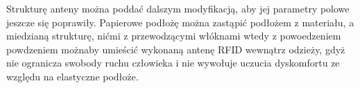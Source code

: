 Strukturę anteny można poddać dalszym modyfikacją, aby jej parametry polowe jeszcze się poprawiły. Papierowe podłożę można zastąpić podłożem z materiału, a miedzianą strukturę, nićmi z przewodzącymi włóknami wtedy z powoedzeniem powdzeniem możnaby umieścić wykonaną antenę RFID wewnątrz odzieży, gdyż nie ogranicza swobody ruchu człowieka i nie wywołuje uczucia dyskomfortu ze względu na elastyczne podłoże.






 















	